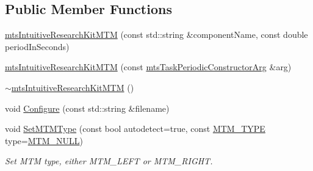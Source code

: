 \subsection*{Public Member Functions}
\begin{DoxyCompactItemize}
\item 
\hyperlink{classmts_intuitive_research_kit_m_t_m_a04f2e11f5ed0f396571f4587dc5f371c}{mts\+Intuitive\+Research\+Kit\+M\+T\+M} (const std\+::string \&component\+Name, const double period\+In\+Seconds)
\item 
\hyperlink{classmts_intuitive_research_kit_m_t_m_aefbd1fec629f58af7134be9bd901339e}{mts\+Intuitive\+Research\+Kit\+M\+T\+M} (const \hyperlink{classmts_task_periodic_constructor_arg}{mts\+Task\+Periodic\+Constructor\+Arg} \&arg)
\item 
\hyperlink{classmts_intuitive_research_kit_m_t_m_a96a009af92205b653fa01b1132eba4e2}{$\sim$mts\+Intuitive\+Research\+Kit\+M\+T\+M} ()
\item 
void \hyperlink{classmts_intuitive_research_kit_m_t_m_a5a5755983895d3d26f3d57736d1f5e8f}{Configure} (const std\+::string \&filename)
\item 
void \hyperlink{classmts_intuitive_research_kit_m_t_m_aa32b8d1cd28f2ef35c65307183dc777d}{Set\+M\+T\+M\+Type} (const bool autodetect=true, const \hyperlink{classmts_intuitive_research_kit_m_t_m_a2122075f3ef6c751e5bf65b690bf5b69}{M\+T\+M\+\_\+\+T\+Y\+P\+E} type=\hyperlink{classmts_intuitive_research_kit_m_t_m_a2122075f3ef6c751e5bf65b690bf5b69a9f51be777b8da63c667b740284ff3001}{M\+T\+M\+\_\+\+N\+U\+L\+L})
\begin{DoxyCompactList}\small\item\em Set M\+T\+M type, either M\+T\+M\+\_\+\+L\+E\+F\+T or M\+T\+M\+\_\+\+R\+I\+G\+H\+T. \end{DoxyCompactList}\end{DoxyCompactItemize}
